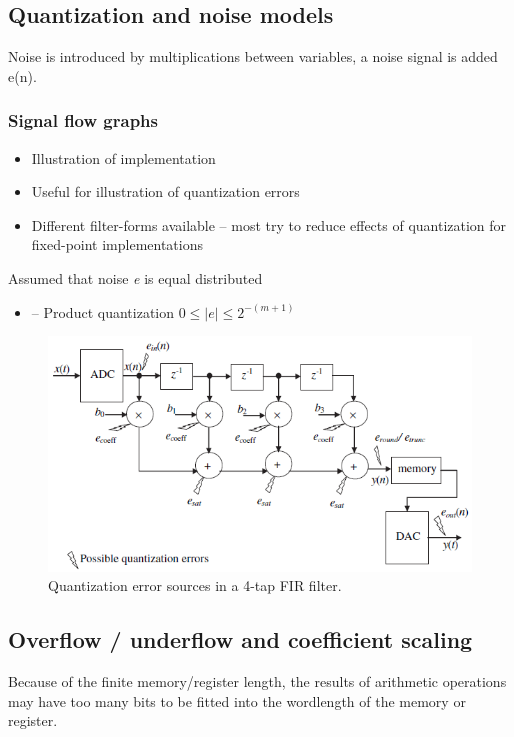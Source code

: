 \subsection{Quantization and noise models}
Noise is introduced by multiplications between variables, a noise signal is added e(n).
\subsubsection{Signal flow graphs}
\begin{itemize}
	\item Illustration of implementation
	\item Useful for illustration of quantization errors
	\item Different filter-forms available – most try to reduce effects of quantization for fixed-point implementations
\end{itemize}

Assumed that noise \textit{e} is equal distributed
\begin{itemize}
	\item – Product quantization $0 \leq |e| \leq 2^{-(m+1)}$
\end{itemize}

\begin{figure} [H]
	\centering
	\includegraphics[width=\linewidth]{graphics/10.png}
	\caption{Quantization error sources in a 4-tap FIR filter.}
	\label{fig:10}
\end{figure}

\subsection{Overflow / underflow and coefficient scaling}
Because of the finite memory/register length, the results of arithmetic operations may have too many bits to be fitted into the wordlength of the memory or register.

